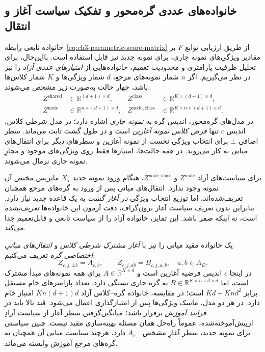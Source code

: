 \subsection{خانواده‌های عددی گره‌محور و تفکیک سیاست آغاز و انتقال}
\label{subsec:ch3-node-policy-families}
خانواده تابعی رابطه~\eqref{eq:ch3-parametric-score-matrix} از طریق ارزیابی
توابع $F$ بر مقادیر ویژگی‌های نمونه جاری، برای نمونه جدید نیز قابل استفاده است.
بااین‌حال، برای تحلیل ظرفیت پارامتری و محدودیت تعمیم، خانواده‌هایی از
\emph{امتیازهای عددی آزاد} را نیز در نظر می‌گیریم. اگر $n$ شمار
نمونه‌های مرجع، $d$ شمار ویژگی‌ها و $K$ شمار کلاس‌ها باشد،
چهار حالت به‌صورت زیر مشخص می‌شوند:
\begin{equation}\label{eq:ch3-policy-family-shapes}
\begin{aligned}
Z^{\mathrm{shared}}&\in\mathbb R^{(d+1)\times d},&
Z^{\mathrm{class}}&\in\mathbb R^{K\times(d+1)\times d},\\
Z^{\mathrm{node}}&\in\mathbb R^{n\times(d+1)\times d},&
Z^{\mathrm{node,class}}&\in\mathbb R^{K\times n\times(d+1)\times d}.
\end{aligned}
\end{equation}
در مدل‌های گره‌محور، اندیس گره به \emph{نمونه جاری} اشاره دارد؛
در مدل شرطی کلاس، اندیس $c$ تنها \emph{فرض کلاس نمونه آغازین}
است و در طول گشت ثابت می‌ماند. سطر اضافی $\bot$ برای انتخاب
ویژگی نخست از نمونه آغازین و سطرهای دیگر برای انتقال‌های میانی
به کار می‌روند. در همه حالت‌ها، امتیازها فقط روی ویژگی‌های
موجود و مجازِ نمونه جاری نرمال می‌شوند.

برای سیاست‌های آزاد $Z^{\mathrm{node}}$ و
$Z^{\mathrm{node,class}}$، هنگام ورود نمونه جدید $X_\star$
ماتریس مختص آن نمونه وجود ندارد. انتقال‌های میانی پس از
ورود به گره‌های مرجع همچنان تعریف‌شده‌اند، اما توزیع
انتخاب ویژگی \emph{در آغاز گشت} به یک قاعده جدید نیاز دارد.
بنابراین بدون تعریف سیاست آغاز برون‌گراف، دقت آزمون این
خانواده‌ها \emph{تعریف‌نشده} است، نه اینکه صفر باشد.
این تمایز، خانواده آزاد را از سیاست تابعی و قابل‌تعمیم جدا می‌کند.

یک خانواده مقید میانی را نیز با \emph{آغاز مشترکِ شرطی کلاس}
و \emph{انتقال‌های میانیِ اختصاصی گره} تعریف می‌کنیم:
\begin{equation}\label{eq:ch3-class-tied-start}
\boxed{
Z_{c,j,\bot b}=A_{c,b},\qquad
Z_{c,j,ab}=B_{c,j,a,b},\quad a,b\in A_D.
}
\end{equation}
در اینجا $c$ اندیس فرضیه آغازین است و $A\in\mathbb R^{K\times d}$ برای همه نمونه‌های مبدأ
مشترک است، اما $B\in\mathbb R^{K\times n\times d\times d}$
به گره جاری بستگی دارد. تعداد پارامترهای خام مستقل برابر
$Kd+Knd^2$ است؛ در مقایسه، خانواده گره--کلاس آزاد
$Kn(d+1)d$ امتیاز خام دارد. در هر دو مدل، ماسک ویژگی‌ها
پس از امتیازگذاری اعمال می‌شود. قید بالا باید در \emph{فرایند
آموزش} برقرار باشد؛ میانگین‌گرفتن سطر آغاز از سیاست آزادِ
ازپیش‌آموخته‌شده، عموماً راه‌حل همان مسئله بهینه‌سازی مقید
نیست. چنین سیاستی برای نمونه جدید، سطر آغازِ مشخص
$A_{c,:}$ دارد، هرچند سیاست میانی آن همچنان به گره‌های
مرجع آموزش وابسته می‌ماند.

